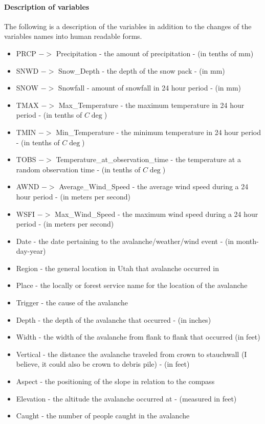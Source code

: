 \documentclass[12pt]{article}
\begin{document}
\paragraph*{Description of variables}
The following is a description of the variables in addition to the changes of the variables names into human readable forms.
\begin{itemize}
\item PRCP $->$ Precipitation - the amount of precipitation - (in tenths of mm)
\item SNWD $->$ Snow\_Depth - the depth of the snow pack - (in mm)
\item SNOW $->$ Snowfall - amount of snowfall in 24 hour period - (in mm)
\item TMAX $->$ Max\_Temperature - the maximum temperature in 24 hour period - (in tenths of $C\deg$)
\item TMIN $->$ Min\_Temperature - the minimum temperature in 24 hour period - (in tenths of $C\deg$)
\item TOBS $->$ Temperature\_at\_observation\_time - the temperature at a random observation time - (in tenths of $C\deg$)
\item AWND $->$ Average\_Wind\_Speed - the average wind speed during a 24 hour period - (in meters per second)
\item WSFI $->$ Max\_Wind\_Speed - the maximum wind speed during a 24 hour period - (in meters per second)
\item Date - the date pertaining to the avalanche/weather/wind event - (in month-day-year)
\item Region - the general location in Utah that avalanche occurred in
\item Place - the locally or forest service name for the location of the avalanche
\item Trigger - the cause of the avalanche
\item Depth - the depth of the avalanche that occurred - (in inches)
\item Width - the width of the avalanche from flank to flank that occurred (in feet)
\item Vertical - the distance the avalanche traveled from crown to stauchwall (I believe, it could also be crown to debris pile) - (in feet)
\item Aspect - the positioning of the slope in relation to the compass
\item Elevation - the altitude the avalanche occurred at - (measured in feet)
\item Caught - the number of people caught in the avalanche

\end{itemize}
\end{document}
